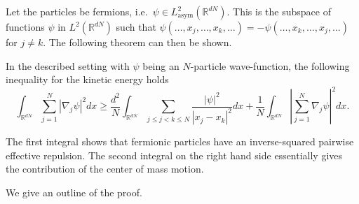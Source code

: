 Let the particles be fermions, i.e.\ $\psi \in L_\text{asym}^2(\mathbb{R}^{dN})$. This is the subspace of functions $\psi$ in $L^2(\mathbb{R}^{dN})$ such that $\psi(\ldots, x_j, \ldots, x_k, \ldots) = - \psi(\ldots, x_k, \ldots, x_j, \ldots)$ for $j \ne k$. The following theorem can then be shown. \cite{methmmp}
\begin{theorem}
  In the described setting with $\psi$ being an $N$-particle wave-function, the following inequality for the kinetic energy holds
  \begin{equation}\label{eq:fermion ineq}
    \int_{\mathbb{R}^{dN}} \sum_{j=1}^N |\nabla_j \psi|^2 dx \ge
    \frac{d^2}{N} \int_{\mathbb{R}^{dN}} \sum_{j \le j < k \le N} \frac{|\psi|^2}{|x_j-x_k|^2} dx +
    \frac{1}{N} \int_{\mathbb{R}^{dN}} \left|\sum_{j=1}^N \nabla_j \psi \right|^2 dx.
  \end{equation}
\end{theorem}

The first integral shows that fermionic particles have an inverse-squared pairwise effective repulsion. The second integral on the right hand side essentially gives the contribution of the center of mass motion.

We give an outline of the proof.

